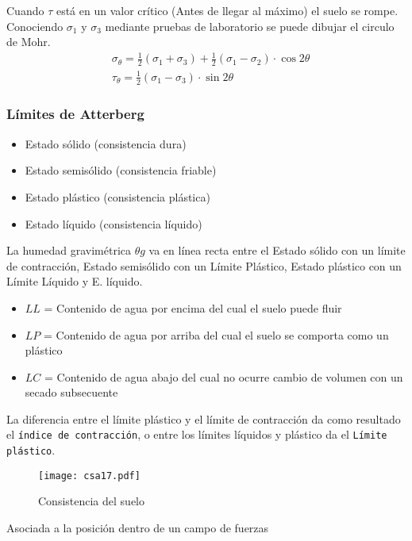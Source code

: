Cuando $\tau$ está en un valor crítico (Antes de llegar al máximo) el suelo se rompe. Conociendo $\sigma_1$ y $\sigma_3$ mediante pruebas de laboratorio se puede dibujar el circulo de Mohr.
\begin{align}
    &\sigma_{\theta}= \frac{1}{2}\left(\sigma_1 +\sigma_3\right) + \frac{1}{2}\left(\sigma_1 -\sigma_2\right) \cdot \cos{2\theta}\\
    &\tau_{\theta} =\frac{1}{2}\left(\sigma_1 -\sigma_3\right)\cdot \sin{2\theta}
\end{align}
\subsubsection{Límites de Atterberg}
\begin{itemize}
    \item Estado sólido (consistencia dura) 
    \item Estado semisólido (consistencia friable)
    \item Estado plástico (consistencia plástica)
    \item Estado líquido (consistencia líquido)
\end{itemize}
La humedad gravimétrica $\theta g$ va en línea recta entre el Estado sólido con un límite de contracción, Estado semisólido con un Límite Plástico, Estado plástico con un Límite Líquido y E. líquido.
\begin{itemize}
    \item $LL$ = Contenido de agua por encima del cual el suelo puede fluir
    \item $LP$ = Contenido de agua por arriba del cual el suelo se comporta como un plástico
    \item $LC$ = Contenido de agua abajo del cual no ocurre cambio de volumen con un secado subsecuente
\end{itemize}
La diferencia entre el límite plástico y el límite de contracción da como resultado el \texttt{índice de contracción}, o entre los límites líquidos y plástico da el \texttt{Límite plástico}.
\begin{figure}[h!]
\centering
  \texttt{[image: csa17.pdf]}
  \caption{Consistencia del suelo}
  \label{csa17}
\end{figure}
\begin{definition}
    Asociada a la posición dentro de un campo de fuerzas
\end{definition}

